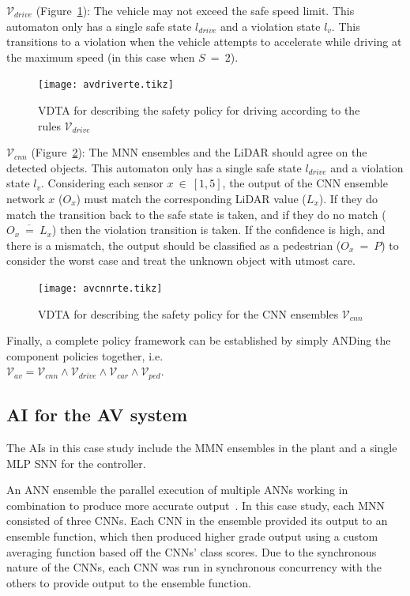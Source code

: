 $\mathcal{V}_{drive}$ (Figure~\ref{fig:avdriverte}): The vehicle may not exceed the safe speed limit. 
This automaton only has a single safe state $l_{drive}$ and a violation state $l_v$.
This transitions to a violation when the vehicle attempts to accelerate while driving at the maximum speed (in this case when $S~=~2$).

\begin{figure}[h]
	\centering
	\texttt{[image: avdriverte.tikz]}
	\caption{\ac{VDTA} for describing the safety policy for driving according to the rules $\mathcal{V}_{drive}$\label{fig:avdriverte}}
\end{figure}

$\mathcal{V}_{cnn}$ (Figure~\ref{fig:avcnnrte}): The \ac{MNN} ensembles and the \ac{LiDAR} should agree on the detected objects.
This automaton only has a single safe state $l_{drive}$ and a violation state $l_v$.
Considering each sensor $x~\in~[1,5]$, the output of the \ac{CNN} ensemble network $x$ ($O_x$) must match the corresponding \ac{LiDAR} value ($L_x$).
If they do match the transition back to the safe state is taken, and if they do no match ($\overline{O_x~=~L_x}$) then the violation transition is taken.
If the confidence is high, and there is a mismatch, the output should be classified as a pedestrian ($O_x~=~P$) to consider the worst case and treat the unknown object with utmost care.

\begin{figure}[h]
	\centering
	\texttt{[image: avcnnrte.tikz]}
	\caption{\ac{VDTA} for describing the safety policy for the \ac{CNN} ensembles $\mathcal{V}_{cnn}$\label{fig:avcnnrte}}
\end{figure}

Finally, a complete policy framework can be established by simply ANDing the component policies together, i.e. \\ $\mathcal{V}_{av} = \mathcal{V}_{cnn} \wedge \mathcal{V}_{drive} \wedge \mathcal{V}_{car} \wedge \mathcal{V}_{ped}$.

\subsection{\acf{AI} for the \acf{AV} system}

The \acp{AI} in this case study include the \ac{MMN} ensembles in the plant and a single \ac{MLP} \ac{SNN} for the controller.

An \ac{ANN} ensemble the parallel execution of multiple \acp{ANN} working in combination to produce more accurate output~\cite{Maqsood2004}.
In this case study, each \ac{MNN} consisted of three \acp{CNN}.
Each \ac{CNN} in the ensemble provided its output to an ensemble function, which then produced higher grade output using a custom averaging function based off the \acp{CNN}' class scores.
Due to the synchronous nature of the \acp{CNN}, each \ac{CNN} was run in synchronous concurrency with the others to provide output to the ensemble function.
	
